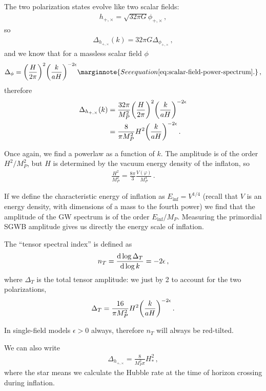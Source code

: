 \documentclass[main.tex]{subfiles}
\begin{document}
The two polarization states evolve like two scalar fields:
%
\begin{align}
h_{+, \times } = \sqrt{32 \pi G} \phi_{+, \times}
\,,
\end{align}
%
so 
%
\begin{align}
\Delta_{h_{+, \times }} (k) = 32 \pi G \Delta_{\phi_{+, \times }}
\,,
\end{align}
%
and we know that for a massless scalar field \(\phi  \)
%
\begin{align}
\Delta_{\phi} = \qty(\frac{H}{2 \pi })^{2} \qty(\frac{k}{aH})^{-2\epsilon }
\marginnote{See equation \eqref{eq:scalar-field-power-spectrum}.}
\,,
\end{align}
%
therefore 
%
\begin{align}
\Delta_{h_{+, \times }} (k)
&= \frac{32 \pi }{M_P^2} \qty(\frac{H}{2 \pi })^2 \qty(\frac{k}{aH})^{-2 \epsilon }  \\
&= \frac{8}{\pi M_P^2} H^2 \qty(\frac{k}{aH})^{-2 \epsilon }
\,.
\end{align}

Once again, we find a powerlaw as a function of \(k\). 
The amplitude is of the order \(H^2 / M_P^2\), but \(H\) is determined by the vacuum energy density of the inflaton, so 
%
\begin{align}
\frac{H^2}{M_P^2} = \frac{8 \pi }{3} \frac{V(\varphi )}{M_P^4}
\,.
\end{align}

If we define the characteristic energy of inflation as \(E_{\text{inf}} = V^{1/4}\) (recall that \(V\) is an energy density, with dimensions of a mass to the fourth power) we find that the amplitude of the GW spectrum is of the order \(E _{\text{inf}} / M_P\). 
Measuring the primordial SGWB amplitude gives us directly the energy scale of inflation. 

The ``tensor spectral index'' is defined as 
%
\begin{align}
n_T = \dv{\log \Delta _T}{\log k} = - 2 \epsilon 
\,,
\end{align}
%
where \(\Delta _T\) is the total tensor amplitude: we just by 2 to account for the two polarizations,
%
\begin{align}
\Delta_T = \frac{16}{\pi M_P^2} H^2 \qty(\frac{k}{aH})^{-2\epsilon }
\,.
\end{align}

In single-field models \(\epsilon > 0\) always, therefore \(n_T \) will always be red-tilted. 

We can also write 
%
\begin{align}
\Delta_{h_{+, \times }} = \frac{8}{M_P^2 \pi } H^2_*
\,,
\end{align}
%
where the star means we calculate the Hubble rate at the time of horizon crossing during inflation. 
\end{document}
